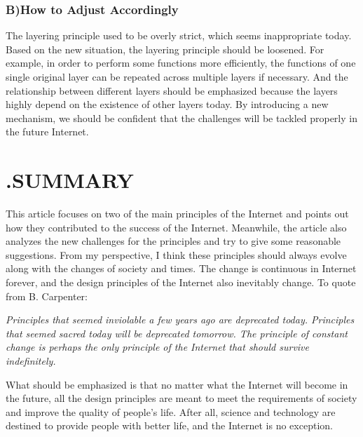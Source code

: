 \documentclass[11pt,twocolumn]{article}
\begin{document}
\subsubsection*{B)\quad How to Adjust Accordingly}

The layering principle used to be overly strict, which seems inappropriate today. Based on the new situation, the layering principle should be loosened\cite{ClarkEvolve}. For example, in order to perform some functions more efficiently, the functions of one single original layer can be repeated across multiple layers if necessary. And the relationship between different layers should be emphasized because the layers highly depend on the existence of other layers today. By introducing a new mechanism\cite{NewP}, we should be confident that the challenges will be tackled properly in the future Internet.

\section*{\textbf{\uppercase\expandafter{}.\quad SUMMARY}}
This article focuses on two of the main principles of the Internet and points out how they contributed to the success of the Internet. Meanwhile, the article also analyzes the new challenges for the principles and try to give some reasonable suggestions. From my perspective, I think these principles should always evolve along with the changes of society and times. The change is continuous in Internet forever, and the design principles of the Internet also inevitably change. To quote from B. Carpenter\cite{Carpenter}:

\emph{
 Principles that seemed inviolable a few years ago are deprecated today. Principles that seemed sacred today will be deprecated tomorrow. The principle of constant change is perhaps the only principle of the Internet that should survive indefinitely. 
}

What should be emphasized is that no matter what the Internet will become in the future, all the design principles are meant to meet the requirements of society and improve the quality of people’s life. After all, science and technology are destined to provide people with better life, and the Internet is no exception.
\end{document}
